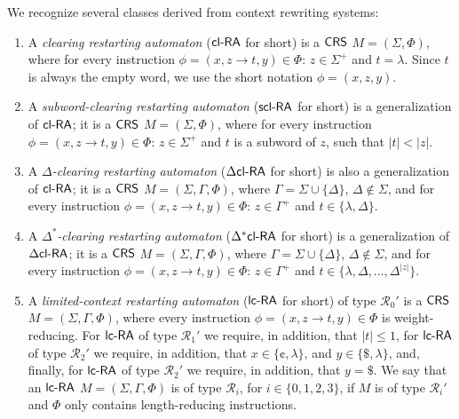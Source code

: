 \begin{definition}\label{definition:derived-classes}
We recognize several classes derived from context rewriting systems:
\begin{enumerate}
\item\label{definition:clra} A \emph{clearing restarting automaton} \cite{CM10} (\emph{$\textup{\sf cl-RA\/}$} for short) is a $\textup{\sf CRS\/}$ $M = (\Sigma, \Phi)$, where for every instruction $\phi = (x, z \to t, y) \in \Phi$: $z \in \Sigma^+$ and $t = \lambda$. Since $t$ is always the empty word, we use the short notation $\phi = (x, z, y)$.

\item\label{definition:sclra}
A \emph{subword-clearing restarting automaton} \cite{C12} (\emph{$\textup{\sf scl-RA}$} for short) is a generalization of $\textup{\sf cl-RA\/}$; it is a $\textup{\sf CRS\/}$ $M = (\Sigma, \Phi)$, where for every instruction $\phi = (x, z \to t, y) \in \Phi$: $z \in \Sigma^+$ and $t$ is a subword of $z$, such that $|t| < |z|$.

\item\label{definition:dclra} A \emph{$\Delta$-clearing restarting automaton} \cite{CM10} (\emph{$\textup{\sf $\Delta$cl-RA\/}$} for short) is also a generalization of $\textup{\sf cl-RA\/}$; it is a $\textup{\sf CRS\/}$ $M = (\Sigma, \Gamma, \Phi)$, where $\Gamma = \Sigma \cup \{\Delta\}$, $\Delta \notin \Sigma$, and for every instruction $\phi = (x, z \to t, y) \in \Phi$: $z \in \Gamma^+$ and $t \in \{\lambda, \Delta\}$.

\item\label{definition:dxclra} A \emph{$\Delta^*$-clearing restarting automaton} \cite{CM10} (\emph{$\textup{\sf $\Delta^*$cl-RA\/}$} for short) is a generalization of $\textup{\sf $\Delta$cl-RA\/}$; it is a $\textup{\sf CRS\/}$ $M = (\Sigma, \Gamma, \Phi)$, where $\Gamma = \Sigma \cup \{\Delta\}$, $\Delta \notin \Sigma$, and for every instruction $\phi = (x, z \to t, y) \in \Phi$: $z \in \Gamma^+$ and $t \in \{\lambda, \Delta, \ldots, \Delta^{|z|}\}$.

\item \label{definition:lcra} A \emph{limited-context restarting automaton} \cite{B10Diploma, B11, OCM13} (\emph{$\lcRA$} for short) of type $\mathcal{R}_0'$ is a $\textup{\sf CRS\/}$ $M = (\Sigma, \Gamma, \Phi)$, where every instruction $\phi = (x, z \to t, y) \in \Phi$ is weight-reducing. For $\lcRA$ of type $\mathcal{R}_1'$ we require, in addition, that $|t| \le 1$, for $\lcRA$ of type $\mathcal{R}_2'$ we require, in addition, that $x \in \{\cent, \lambda\}$, and $y \in \{\$, \lambda\}$, and, finally, for $\lcRA$ of type $\mathcal{R}_2'$ we require, in addition, that $y = \$$. We say that an $\lcRA$ $M=(\Sigma,\Gamma,\Phi)$ is of type $\mathcal{R}_i$, for $i \in \{0, 1, 2, 3\}$, if $M$ is of type $\mathcal{R}_i'$ and $\Phi$ only contains length-reducing instructions.
\end{enumerate}
\end{definition}

